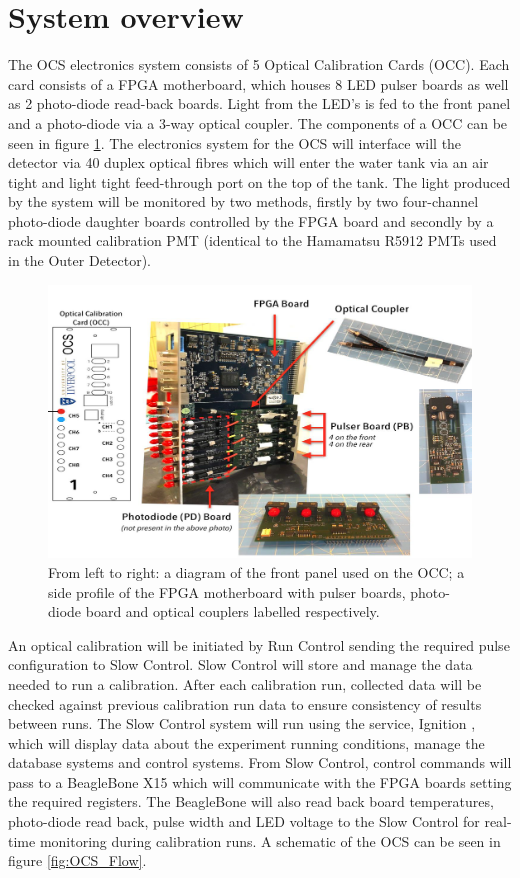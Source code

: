 \section{System overview}
The OCS electronics system consists of 5 Optical Calibration Cards (OCC). Each card consists of a FPGA motherboard, which houses 8 LED pulser boards as well as 2 photo-diode read-back boards. Light from the LED's is fed to the front panel and a photo-diode via a 3-way optical coupler. The components of a OCC can be seen in figure \ref{fig:OCC}. The electronics system for the OCS will interface will the detector via 40 duplex optical fibres which will enter the water tank via an air tight and light tight feed-through port on the top of the tank. The light produced by the system will be monitored by two methods, firstly by two four-channel photo-diode daughter boards controlled by the FPGA board and secondly by a rack mounted calibration PMT (identical to the Hamamatsu R5912 PMTs used in the Outer Detector).

\begin{figure}[h]
    \centering
    \includegraphics[width=\textwidth]{Figures/OCC.png}
    \caption{From left to right: a diagram of the front panel used on the OCC; a side profile of the FPGA motherboard with pulser boards, photo-diode board and optical couplers labelled respectively.}
    \label{fig:OCC}
\end{figure}

An optical calibration will be initiated by Run Control sending the required pulse configuration to Slow Control. Slow Control will store and manage the data needed to run a calibration. After each calibration run, collected data will be checked against previous calibration run data to ensure consistency of results between runs. The Slow Control system will run using the service, Ignition \cite{IgnitionWeb}, which will display data about the experiment running conditions, manage the database systems and control systems.
\newline
From Slow Control, control commands will pass to a BeagleBone X15 which will communicate with the FPGA boards setting the required registers. The BeagleBone will also read back board temperatures, photo-diode read back, pulse width and LED voltage to the Slow Control for real-time monitoring during calibration runs. A schematic of the OCS can be seen in figure \ref{fig:OCS_Flow}.  


